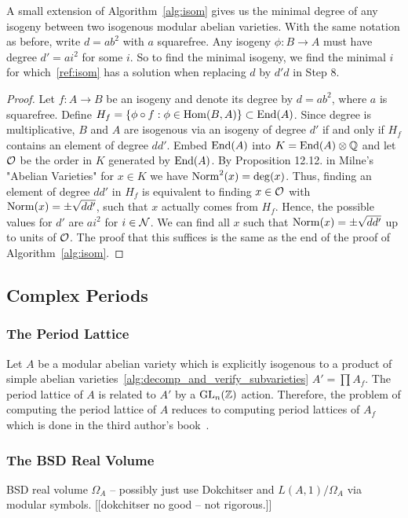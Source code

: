 \documentclass{article}
\begin{document}
A small extension of Algorithm~\ref{alg:isom} gives us the minimal degree of any
isogeny between two isogenous modular abelian varieties. With the same
notation as before, write $d=ab^2$ with $a$ squarefree. Any isogeny $\phi:B\to
A$ must have degree $d'=ai^2$ for some $i$. So to find the minimal isogeny, we
find the minimal $i$ for which~\ref{ref:isom} has a solution when replacing $d$
by $d'd$ in Step 8. 
\begin{proof}
    Let $f:A \to B$ be an isogeny and denote its degree by $d = ab^2$, where $a$ is
    squarefree. Define $H_f = \{\phi \circ f: \phi \in
    \operatorname{Hom}(B,A)\} \subset \operatorname{End}(A)$. Since degree is multiplicative, $B$ and $A$ are
    isogenous via an isogeny of degree $d'$ if and only if $H_f$ contains an element
    of degree $d d'$. Embed
    $\operatorname{End}(A)$ into $K = \operatorname{End}(A) \otimes \mathbb{Q}$ and let $\mathcal{O}$ be the order in $K$
    generated by $\operatorname{End}(A)$. By Proposition 12.12. in Milne's "Abelian Varieties"
    for $x \in K$ we have $\operatorname{Norm}^2(x) = \deg(x)$. Thus, finding an element of
    degree $dd'$ in $H_f$ is equivalent to finding $x \in \mathcal{O}$ with $\operatorname{Norm}(x) =
    \pm \sqrt{dd'}$, such that $x$ actually comes from $H_f$. Hence, the possible
    values for $d'$ are $a i^2$ for $i \in \mathcal{N}$. We can find all $x$
    such that $\operatorname{Norm}(x) = \pm \sqrt{dd'}$ up to units of $\mathcal{O}$.
    The proof that this suffices is the same as the end of the
    proof of Algorithm~\ref{alg:isom}.
\end{proof}


\subsection{Complex Periods}


\subsubsection{The Period Lattice}

Let $A$ be a modular abelian variety which is explicitly isogenous to a product
of simple abelian varieties~\ref{alg:decomp_and_verify_subvarieties} $A'=\prod
A_f$. The period lattice of $A$ is related to $A'$ by a $\operatorname{GL}_n(\mathbb{Z})$ action.
Therefore, the problem of computing the period lattice of $A$ reduces to
computing period lattices of $A_f$ which is done in the third author's
book~\cite[\S 10.6]{stein:modular_forms:2007}.


\subsubsection{The BSD Real Volume}
BSD real volume $\Omega_A$ -- possibly just use Dokchitser and
$L(A,1)/\Omega_A$ via modular symbols.  [[dokchitser no good -- not rigorous.]]
\end{document}
